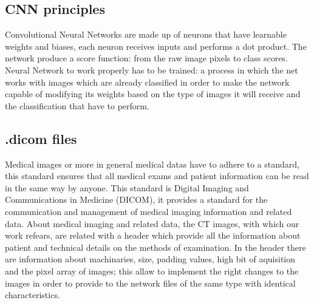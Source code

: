 \documentclass[../main.tex]{subfiles}
\begin{document}
\subsection{CNN principles}
Convolutional Neural Networks are made up of neurons that have learnable weights and biases, each neuron receives inputs and performs a dot product. The network produce a score function: from the raw image pixels to class scores. 
Neural Network to work properly has to be trained: a process in which the net works with images which are already classified in order to make the network capable of modifying its weights based on the type of images it will receive and the classification that have to perform.
\vspace{5mm}

\subsection{.dicom files}
Medical images or more in general medical datas have to adhere to a standard, this standard ensures that all medical exams and patient information can be read in the same way by anyone. This standard is Digital Imaging and Communications in Medicine (DICOM), it provides a standard for the communication and management of medical imaging information and related data.
About medical imaging and related data, the CT images, with which our work refears, are related with a header which provide all the information about patient and technical details on the methods of examination. In the header there are information about machinaries, size, padding values, high bit of aquisition and the pixel array of images; this allaw to implement the right changes to the images in order to provide to the network files of the same type with identical characteristics.
\vspace{5mm}
\end{document}
